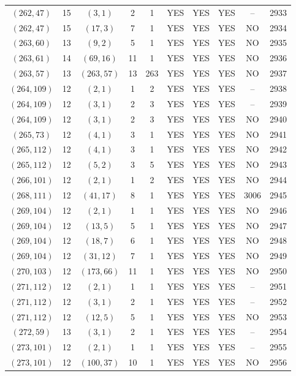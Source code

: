 \begin{longtable}{|c|c|c|c|c|c|c|c|c|c|}
$(262, 47)$ & 15 & $(3, 1)$ & 2 & 1 & YES & YES & YES & -- & 2933\\
$(262, 47)$ & 15 & $(17, 3)$ & 7 & 1 & YES & YES & YES & NO & 2934\\
$(263, 60)$ & 13 & $(9, 2)$ & 5 & 1 & YES & YES & YES & NO & 2935\\
$(263, 61)$ & 14 & $(69, 16)$ & 11 & 1 & YES & YES & YES & NO & 2936\\
$(263, 57)$ & 13 & $(263, 57)$ & 13 & 263 & YES & YES & YES & NO & 2937\\
$(264, 109)$ & 12 & $(2, 1)$ & 1 & 2 & YES & YES & YES & -- & 2938\\
$(264, 109)$ & 12 & $(3, 1)$ & 2 & 3 & YES & YES & YES & -- & 2939\\
$(264, 109)$ & 12 & $(3, 1)$ & 2 & 3 & YES & YES & YES & NO & 2940\\
$(265, 73)$ & 12 & $(4, 1)$ & 3 & 1 & YES & YES & YES & NO & 2941\\
$(265, 112)$ & 12 & $(4, 1)$ & 3 & 1 & YES & YES & YES & NO & 2942\\
$(265, 112)$ & 12 & $(5, 2)$ & 3 & 5 & YES & YES & YES & NO & 2943\\
$(266, 101)$ & 12 & $(2, 1)$ & 1 & 2 & YES & YES & YES & NO & 2944\\
$(268, 111)$ & 12 & $(41, 17)$ & 8 & 1 & YES & YES & YES & 3006 & 2945\\
$(269, 104)$ & 12 & $(2, 1)$ & 1 & 1 & YES & YES & YES & NO & 2946\\
$(269, 104)$ & 12 & $(13, 5)$ & 5 & 1 & YES & YES & YES & NO & 2947\\
$(269, 104)$ & 12 & $(18, 7)$ & 6 & 1 & YES & YES & YES & NO & 2948\\
$(269, 104)$ & 12 & $(31, 12)$ & 7 & 1 & YES & YES & YES & NO & 2949\\
$(270, 103)$ & 12 & $(173, 66)$ & 11 & 1 & YES & YES & YES & NO & 2950\\
$(271, 112)$ & 12 & $(2, 1)$ & 1 & 1 & YES & YES & YES & -- & 2951\\
$(271, 112)$ & 12 & $(3, 1)$ & 2 & 1 & YES & YES & YES & -- & 2952\\
$(271, 112)$ & 12 & $(12, 5)$ & 5 & 1 & YES & YES & YES & NO & 2953\\
$(272, 59)$ & 13 & $(3, 1)$ & 2 & 1 & YES & YES & YES & -- & 2954\\
$(273, 101)$ & 12 & $(2, 1)$ & 1 & 1 & YES & YES & YES & -- & 2955\\
$(273, 101)$ & 12 & $(100, 37)$ & 10 & 1 & YES & YES & YES & NO & 2956\\

\end{longtable}
